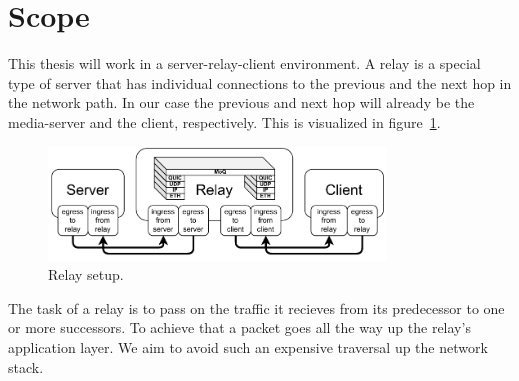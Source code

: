 \section{Scope}\label{sec:scope}

This thesis will work in a server-relay-client environment.
A relay is a special type of server that has individual 
connections to the previous and the next hop in the network path.
In our case the previous and next hop will already be the media-server and 
the client, respectively.
This is visualized in figure~\ref{fig:relay_setup}.
\vspace{0.5cm}
\begin{figure}[H]
    \centering
    \includegraphics[width=0.8\textwidth]{figures/02_background/general-relay.drawio.pdf}
    \caption[Server-Relay-Client-Setup]{Relay setup.}\label{fig:relay_setup}
\end{figure}
The task of a relay is to pass on the traffic it recieves from its predecessor
to one or more successors.
To achieve that a packet goes all the way up the relay's application layer.
We aim to avoid such an expensive traversal up the network stack.
\\

